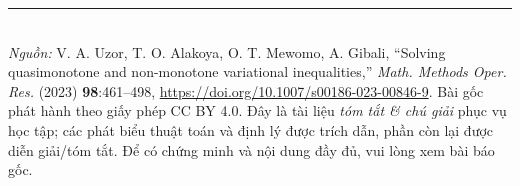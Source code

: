 \documentclass[11pt,a4paper]{article}
\theoremstyle{plain}
\theoremstyle{definition}
\begin{document}
\vfill
\noindent\rule{\linewidth}{0.4pt}\\[2pt]
{\footnotesize\textit{Nguồn:} V. A. Uzor, T. O. Alakoya, O. T. Mewomo, A. Gibali, ``Solving quasimonotone and non-monotone variational inequalities,'' \textit{Math. Methods Oper. Res.} (2023) \textbf{98}:461--498, \url{https://doi.org/10.1007/s00186-023-00846-9}. Bài gốc phát hành theo giấy phép CC BY 4.0. Đây là tài liệu \emph{tóm tắt \& chú giải} phục vụ học tập; các phát biểu thuật toán và định lý được trích dẫn, phần còn lại được diễn giải/tóm tắt. Để có chứng minh và nội dung đầy đủ, vui lòng xem bài báo gốc.}
\end{document}
